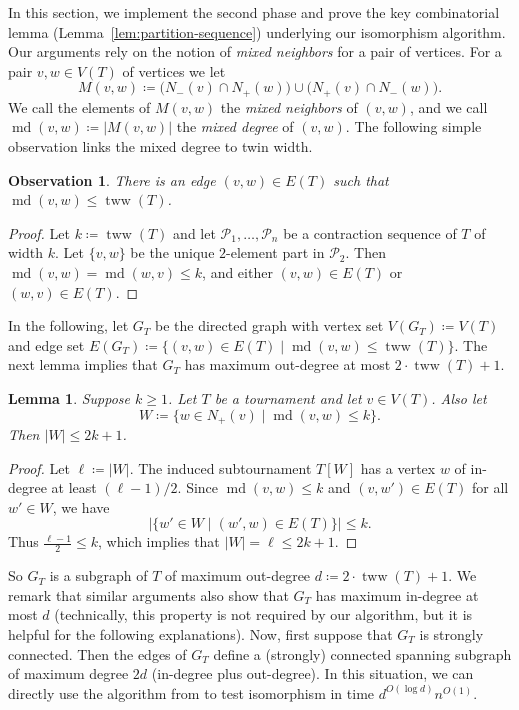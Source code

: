 \PassOptionsToPackage{dvipsnames,svgnames}{xcolor}\documentclass[10pt,a4paper]{article}
\newtheorem{lemma}{Lemma}[section]
\newtheorem{observation}{Observation}[section]
\newcommand{\CP}{{\mathcal P}}
\DeclareMathOperator{\md}{md}
\DeclareMathOperator{\tww}{tww}
\begin{document}
In this section, we implement the second phase and prove the key combinatorial lemma (Lemma~\ref{lem:partition-sequence}) underlying our isomorphism algorithm.
Our arguments rely on the notion of \emph{mixed neighbors} for a pair of vertices.
For a pair $v,w\in V(T)$ of vertices we let
\begin{equation}
 M(v,w) \coloneqq \Big(N_-(v)\cap N_+(w)\Big)\cup \Big(N_+(v)\cap N_-(w)\Big).
\end{equation}
We call the elements of $M(v,w)$ the \emph{mixed neighbors} of $(v,w)$,
and we call $\md(v,w) \coloneqq |M(v,w)|$ the \emph{mixed degree} of $(v,w)$.
The following simple observation links the mixed degree to twin width.

\begin{observation}
 \label{obs:edge-small-mixed-degree}
 There is an edge $(v,w) \in E(T)$ such that $\md(v,w) \leq \tww(T)$.
\end{observation}

\begin{proof}
 Let $k \coloneqq \tww(T)$ and let $\CP_1,\dots,\CP_n$ be a contraction sequence of $T$ of width $k$.
 Let $\{v,w\}$ be the unique $2$-element part in $\CP_2$.
 Then $\md(v,w)=\md(w,v) \leq k$, and either $(v,w)\in E(T)$ or $(w,v)\in E(T)$.
\end{proof}

In the following, let $G_T$ be the directed graph with vertex set $V(G_T) \coloneqq V(T)$ and edge set $E(G_T) \coloneqq \{(v,w) \in E(T) \mid \md(v,w) \leq \tww(T)\}$.
The next lemma implies that $G_T$ has maximum out-degree at most $2\cdot\tww(T) + 1$.

\begin{lemma}
 \label{lem:mixed-degree-few-neighbors}
 Suppose $k \geq 1$.
 Let $T$ be a tournament and let $v \in V(T)$.
 Also let
 \[W \coloneqq \{w \in N_+(v) \mid \md(v,w) \leq k\}.\]
 Then $|W| \leq 2k + 1$.
\end{lemma}

\begin{proof}
 Let $\ell \coloneqq |W|$. The induced subtournament $T[W]$ has
 a vertex $w$ of in-degree at least $(\ell-1)/2$.
 Since $\md(v,w) \leq k$ and $(v,w') \in E(T)$ for all $w' \in W$, we have
 \[|\{w' \in W \mid (w',w) \in E(T)\}| \leq k.\]
 Thus $\frac{\ell - 1}{2} \leq k$, which implies that $|W| = \ell \leq 2k + 1$.
\end{proof}

So $G_T$ is a subgraph of $T$ of maximum out-degree $d \coloneqq 2\cdot\tww(T) + 1$.
We remark that similar arguments also show that $G_T$ has maximum in-degree at most $d$ (technically, this property is not required by our algorithm, but it is helpful for the following explanations).
Now, first suppose that $G_T$ is strongly connected.
Then the edges of $G_T$ define a (strongly) connected spanning subgraph of maximum degree $2d$ (in-degree plus out-degree).
In this situation, we can directly use the algorithm from \cite{ArvindPR25} to test isomorphism in time $d^{O(\log d)}n^{O(1)}$.
\end{document}
